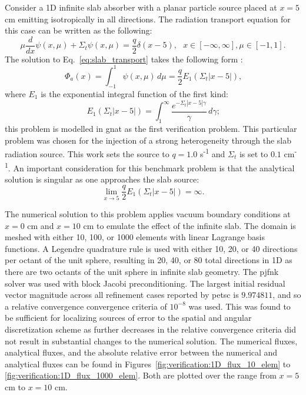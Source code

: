 Consider a 1D infinite slab absorber with a planar particle source placed at $x = 5$ cm emitting isotropically in all directions. The radiation transport equation for this case can be written as the following:
\begin{equation}\label{eq:slab_transport}
    \mu\frac{d}{dx}\psi(x, \mu) + \Sigma_{t}\psi(x,\mu) = \frac{q}{2}\delta(x - 5),\,\,\,\,x\in[-\infty, \infty],\mu\in[-1, 1]\text{.}
\end{equation}
The solution to Eq.~\ref{eq:slab_transport} takes the following form \cite{computational_methods}:
\begin{equation}\label{eq:slab_transport_solution}
    \Phi_{a}(x) = \int_{-1}^{1} \psi(x,\mu)\,d\mu = \frac{q}{2}E_{1}(\Sigma_{t}|x - 5|)\text{,}
\end{equation}
where $E_{1}$ is the exponential integral function of the first kind:
\begin{equation}\label{eq:exp_integral}
    E_{1}(\Sigma_{t}|x - 5|) = \int_{1}^{\infty}\frac{e^{-\Sigma_{t}|x - 5| \gamma}}{\gamma}\,d\gamma\text{;}
\end{equation}
this problem is modelled in \acrshort{gnat} as the first verification problem. This particular problem was chosen for the injection of a strong heterogeneity through the slab radiation source. This work sets the source to $q = 1.0$ s\textsuperscript{-1} and $\Sigma_{t}$ is set to $0.1$ cm\textsuperscript{-1}. An important consideration for this benchmark problem is that the analytical solution is singular as one approaches the slab source:
\begin{equation}
    \lim_{x\rightarrow 5}\frac{q}{2}E_{1}(\Sigma_{t}|x - 5|) = \infty\text{.}
\end{equation}

The numerical solution to this problem applies vacuum boundary conditions at $x = 0$ cm and $x = 10$ cm to emulate the effect of the infinite slab. The domain is meshed with either 10, 100, or 1000 elements with linear Lagrange basis functions. A Legendre quadrature rule is used with either 10, 20, or 40 directions per octant of the unit sphere, resulting in 20, 40, or 80 total directions in 1D as there are two octants of the unit sphere in infinite slab geometry. The \acrfull{pjfnk} solver was used with block Jacobi preconditioning. The largest initial residual vector magnitude across all refinement cases reported by \acrshort{petsc} is $9.974811$, and so a relative convergence convergence criteria of $10^{-8}$ was used. This was found to be sufficient for localizing sources of error to the spatial and angular discretization scheme as further decreases in the relative convergence criteria did not result in substantial changes to the numerical solution. The numerical fluxes, analytical fluxes, and the absolute relative error between the numerical and analytical fluxes can be found in Figures~\ref{fig:verification:1D_flux_10_elem} to \ref{fig:verification:1D_flux_1000_elem}. Both are plotted over the range from $x = 5$ cm to $x = 10$ cm.

